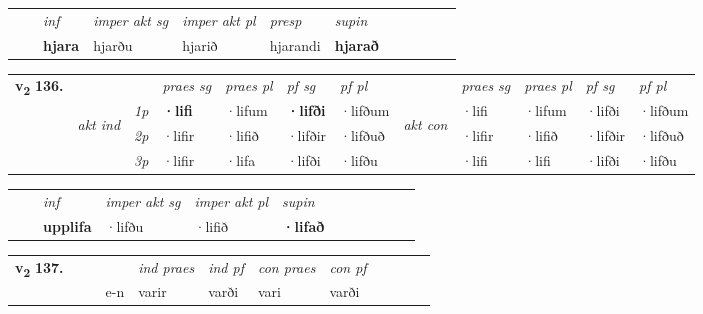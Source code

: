 \begin{tabular}{llllllllllll}
 & & \textit{inf} & \textit{imper akt sg} & \textit{imper akt pl}   & \textit{presp} & \textit{supin}       \\*
  & & \textbf{hjara} & hjarðu  & hjarið   & hjarandi &  \textbf{hjarað}   \\*
\cmidrule{1-12}
\end{tabular}



\begin{tabular}{llllllllllll} \toprule
\multirow{4}{*}{{{\textbf{v{\textsubscript{2}}} \Large{\textbf{136.}}}}}  & &   &  \textit{praes sg}  & \textit{praes pl}  &\textit{ pf sg} & \textit{pf pl} &  &  \textit{praes sg}  & \textit{praes pl}  & \textit{pf sg} & \textit{pf pl } \\*
	\cmidrule{4-7} \cmidrule{9-12}
 & \multirow{3}{*}{\begin{turn}{90}\textit{akt ind}\end{turn}} & {\textit{1p}} & \textbf{·lifi} & ·lifum    & \textbf{·lifði} & ·lifðum & \multirow{3}{*}{\begin{turn}{90}\textit{akt con}\end{turn}} &·lifi & ·lifum & ·lifði & ·lifðum\\*
& &  {\textit{2p}} &  ·lifir  & ·lifið   & ·lifðir & ·lifðuð & & ·lifir & ·lifið & ·lifðir & ·lifðuð \\*
& &  {\textit{3p}} & ·lifir & ·lifa   & ·lifði & ·lifðu & & ·lifi & ·lifi& ·lifði & ·lifðu  \\*
\cmidrule{4-7} \cmidrule{9-12}
\end{tabular}


\begin{tabular}{llllllllllll}
 & & \textit{inf} & \textit{imper akt sg} & \textit{imper akt pl}    & \textit{supin}       \\*
  & & \textbf{upplifa} & ·lifðu  & ·lifið    &  \textbf{·lifað}   \\*
\cmidrule{1-12}
\end{tabular}





\begin{tabular}{llllllllllll}\toprule
\multirow{4}{*}{{{\textbf{v{\textsubscript{2}}} \Large{\textbf{137.}}}}}  & &  & &  \textit{ind praes} & \textit{ind pf} & \textit{con praes} & \textit{con pf} \\*
&  & & e-n & varir & varði & vari & varði \\*
\cmidrule{5-9}
\end{tabular}


